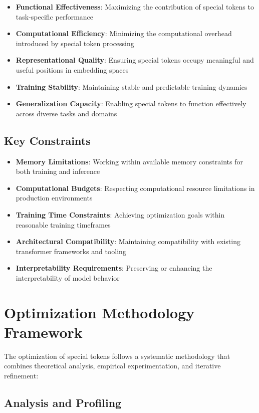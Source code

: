 \begin{itemize}
\item \textbf{Functional Effectiveness}: Maximizing the contribution of special tokens to task-specific performance
\item \textbf{Computational Efficiency}: Minimizing the computational overhead introduced by special token processing
\item \textbf{Representational Quality}: Ensuring special tokens occupy meaningful and useful positions in embedding spaces
\item \textbf{Training Stability}: Maintaining stable and predictable training dynamics
\item \textbf{Generalization Capacity}: Enabling special tokens to function effectively across diverse tasks and domains
\end{itemize}

\subsection{Key Constraints}

\begin{itemize}
\item \textbf{Memory Limitations}: Working within available memory constraints for both training and inference
\item \textbf{Computational Budgets}: Respecting computational resource limitations in production environments
\item \textbf{Training Time Constraints}: Achieving optimization goals within reasonable training timeframes
\item \textbf{Architectural Compatibility}: Maintaining compatibility with existing transformer frameworks and tooling
\item \textbf{Interpretability Requirements}: Preserving or enhancing the interpretability of model behavior
\end{itemize}

\section{Optimization Methodology Framework}

The optimization of special tokens follows a systematic methodology that combines theoretical analysis, empirical experimentation, and iterative refinement:

\subsection{Analysis and Profiling}

